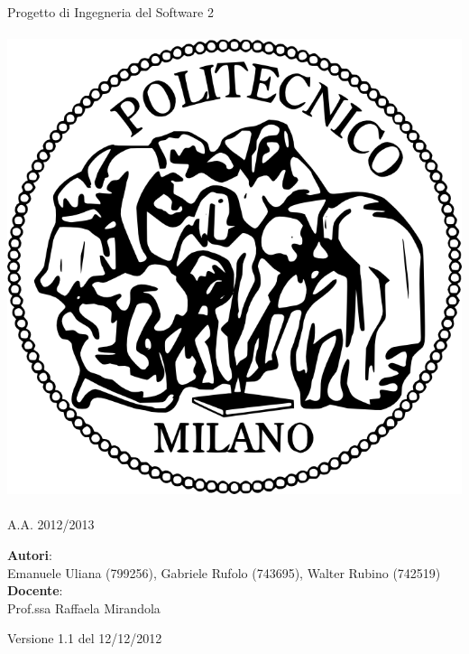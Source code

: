 \documentclass[a4paper,12pt]{article}
\begin{document}
\vspace*{\fill}
\begin{center}
{\fontsize{28}{10} \selectfont \textcolor{mygrey}{Progetto di Ingegneria del Software 2} \\[2\baselineskip]} {\fontsize{42}{10} \selectfont {\bfseries SWIMv2}} \\[4\baselineskip]
\includegraphics[scale=0.4]{polimi} \\[4\baselineskip]
{\fontsize{28}{10} \selectfont {\bfseries \textcolor{blue}{Requirements Analysis Specification Document}} \\[2\baselineskip] A.A. 2012/2013}
\end{center}
\begin{flushleft}
{\fontsize{18}{10}
{\bfseries Autori}: \\ Emanuele Uliana (799256), Gabriele Rufolo (743695), Walter Rubino (742519) \\[1\baselineskip]
{\bfseries Docente}: \\ Prof.ssa Raffaela Mirandola
}
\end{flushleft}
\vspace*{\fill}
\begin{center}
Versione 1.1 del 12/12/2012 \\
\end{center}
\end{document}

